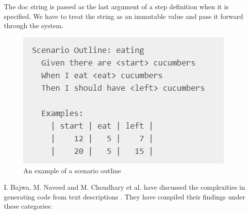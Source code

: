 \documentclass[conference, onecolumn, a4, 12pt]{IEEEtran}
\begin{document}
\begin{itemize}
	The doc string is passed as the last argument of a step definition when it is specified. We have to treat the string as an immutable value and pass it forward through the system.
	\begin{figure}
		\includegraphics[width=\linewidth]{Scenario_outline.png}
		\caption{An example of a scenario outline}
		\label{fig15}
	\end{figure}
\end{itemize}

I. Bajwa, M. Naveed and M. Choudhary et al. have discussed the complexities in generating code from text descriptions \cite{e1}. They have compiled their findings under these categories:
\end{document}

